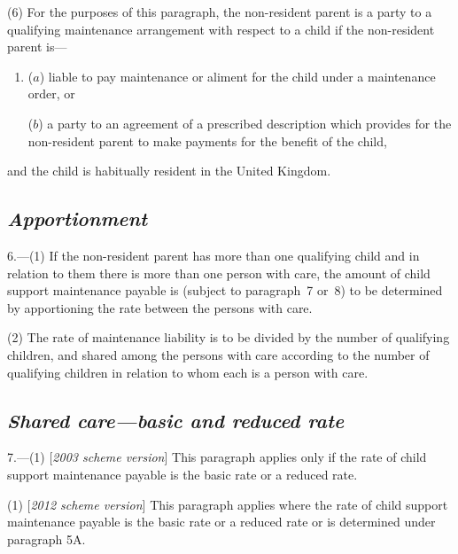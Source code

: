 \documentclass[12pt,a4paper]{article}
\begin{document}
(6) For the purposes of this paragraph, the non-resident parent is a party to a qualifying maintenance arrangement with respect to a child if the non-resident parent is—
\begin{enumerate}\item[]
($a$) liable to pay maintenance or aliment for the child under a maintenance order, or

($b$) a party to an agreement of a prescribed description which provides for the non-resident parent to make payments for the benefit of the child,
\end{enumerate}
and the child is habitually resident in the United Kingdom.


\subsection*{\itshape Apportionment}

6.---(1) If the non-resident parent has more than one qualifying child and in relation to them there is more than one person with care, the amount of child support maintenance payable is (subject to paragraph~7 or~8) to be determined by apportioning the rate between the persons with care.

(2) The rate of maintenance liability is to be divided by the number of qualifying children, and shared among the persons with care according to the number of qualifying children in relation to whom each is a person with care.

\subsection*{\itshape Shared care—basic and reduced rate}

7.---(1) [\emph{2003 scheme version}] This paragraph applies only if the rate of child support maintenance payable is the basic rate or a reduced rate.

(1) [\emph{2012 scheme version}] This paragraph applies where the rate of child support maintenance payable is the basic rate or a reduced rate or is determined under paragraph 5A.
\end{document}
